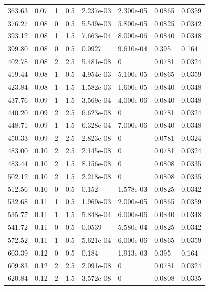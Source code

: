 \documentclass[preview]{standalone}
\begin{document}
{{\begin{tabular}{L{1.2cm}C{1.2cm} C{0.3cm}C{0.5cm} C{1.4cm}C{1.4cm} C{1.4cm}C{1.4cm}}
  363.63  &  0.07  & 1     & 0.5 &  2.237e-03  & 2.300e-05  & 0.0865 &  0.0359   \\ 
  376.27  &  0.08  & 0     & 0.5 &  5.549e-03  & 5.800e-05  & 0.0825 &  0.0342   \\ 
  393.12  &  0.08  & 1     & 1.5 &  7.663e-04  & 8.000e-06  & 0.0840 &  0.0348   \\ 
  399.80  &  0.08  & 0     & 0.5 &  0.0927  & 9.610e-04  & 0.395 &  0.164   \\ 
  402.78  &  0.08  & 2     & 2.5 &  5.481e-08  & 0  & 0.0781 &  0.0324   \\ 
  419.44  &  0.08  & 1     & 0.5 &  4.954e-03  & 5.100e-05  & 0.0865 &  0.0359   \\ 
  423.84  &  0.08  & 1     & 1.5 &  1.582e-03  & 1.600e-05  & 0.0840 &  0.0348   \\ 
  437.76  &  0.09  & 1     & 1.5 &  3.569e-04  & 4.000e-06  & 0.0840 &  0.0348   \\ 
  440.20  &  0.09  & 2     & 2.5 &  6.623e-08  & 0  & 0.0781 &  0.0324   \\ 
  448.71  &  0.09  & 1     & 1.5 &  6.328e-04  & 7.000e-06  & 0.0840 &  0.0348   \\ 
  450.33  &  0.09  & 2     & 2.5 &  2.823e-08  & 0  & 0.0781 &  0.0324   \\ 
  483.00  &  0.10  & 2     & 2.5 &  2.145e-08  & 0  & 0.0781 &  0.0324   \\ 
  483.44  &  0.10  & 2     & 1.5 &  8.156e-08  & 0  & 0.0808 &  0.0335   \\ 
  502.12  &  0.10  & 2     & 1.5 &  2.218e-08  & 0  & 0.0808 &  0.0335   \\ 
  512.56  &  0.10  & 0     & 0.5 &  0.152  & 1.578e-03  & 0.0825 &  0.0342   \\ 
  532.68  &  0.11  & 1     & 0.5 &  1.969e-03  & 2.000e-05  & 0.0865 &  0.0359   \\ 
  535.77  &  0.11  & 1     & 1.5 &  5.848e-04  & 6.000e-06  & 0.0840 &  0.0348   \\ 
  541.72  &  0.11  & 0     & 0.5 &  0.0539  & 5.580e-04  & 0.0825 &  0.0342   \\ 
  572.52  &  0.11  & 1     & 0.5 &  5.621e-04  & 6.000e-06  & 0.0865 &  0.0359   \\ 
  603.39  &  0.12  & 0     & 0.5 &  0.184  & 1.913e-03  & 0.395 &  0.164   \\ 
  609.83  &  0.12  & 2     & 2.5 &  2.091e-08  & 0  & 0.0781 &  0.0324   \\ 
  620.84  &  0.12  & 2     & 1.5 &  3.572e-08  & 0  & 0.0808 &  0.0335   \\ 

\end{tabular}}}
\end{document}
